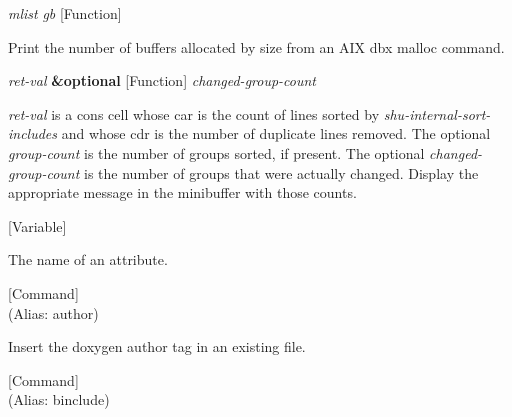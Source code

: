 \vspace{1em}
\noindent
{}
\usebox{\funcname}\emph{mlist} \emph{gb}
 \hfill [Function]

\begin{doc-string}
Print the number of buffers allocated by size from an AIX dbx malloc command.
\end{doc-string}

\vspace{1em}
\noindent
{}
\usebox{\funcname}\emph{ret-val} \textbf{\&optional}
 \hfill [Function]
\hspace*{\wd\funcname}\emph{changed-group-count}

\begin{doc-string}
\emph{ret-val} is a cons cell whose car is the count of lines sorted by
\emph{shu-internal-sort-includes} and whose cdr is the number of duplicate lines
removed.  The optional \emph{group-count} is the number of groups sorted, if present.
The optional \emph{changed-group-count} is the number of groups that were actually
changed.  Display the appropriate message in the minibuffer with those counts.
\end{doc-string}

\vspace{1em}
\noindent
{}
\usebox{\funcname}
 \hfill [Variable]

\begin{doc-string}
The name of an attribute.
\end{doc-string}

\vspace{1em}
\noindent
{}
\usebox{\funcname}
 \hfill [Command]\\%
 (Alias: author)

\begin{doc-string}
Insert the doxygen author tag in an existing file.
\end{doc-string}

\vspace{1em}
\noindent
{}
\usebox{\funcname}
 \hfill [Command]\\%
 (Alias: binclude)

